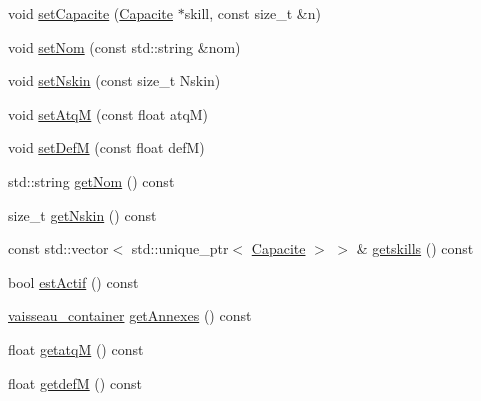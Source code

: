\begin{DoxyCompactItemize}
\item 
void \mbox{\hyperlink{class_vaisseau_ade448f61f366a5b94fbc03c955963398}{set\+Capacite}} (\mbox{\hyperlink{class_capacite}{Capacite}} $\ast$skill, const size\+\_\+t \&n)
\item 
void \mbox{\hyperlink{class_vaisseau_a2dbe73bcc7b94642ad0eff30413842d7}{set\+Nom}} (const std\+::string \&nom)
\item 
void \mbox{\hyperlink{class_vaisseau_a0c680cba0243fac2ecda59bd2fc1f1fd}{set\+Nskin}} (const size\+\_\+t Nskin)
\item 
void \mbox{\hyperlink{class_vaisseau_aad5885e38fac754abd372769c8d2dbfa}{set\+AtqM}} (const float atqM)
\item 
void \mbox{\hyperlink{class_vaisseau_a0a2a699a3a0234cbe92683b990329ae3}{set\+DefM}} (const float defM)
\item 
std\+::string \mbox{\hyperlink{class_vaisseau_a57c40e657151598e9f5ffd3dd2fdc15a}{get\+Nom}} () const
\item 
size\+\_\+t \mbox{\hyperlink{class_vaisseau_a61a0c0d457d87ebc081b5dea42748e78}{get\+Nskin}} () const
\item 
const std\+::vector$<$ std\+::unique\+\_\+ptr$<$ \mbox{\hyperlink{class_capacite}{Capacite}} $>$ $>$ \& \mbox{\hyperlink{class_vaisseau_a7026c8c71519ca32d0e41ff455775edc}{getskills}} () const
\item 
bool \mbox{\hyperlink{class_vaisseau_a4f0c76d144f9f5f41b254bde4eb350da}{est\+Actif}} () const
\item 
\mbox{\hyperlink{def__type_8h_ad123ed7c93f42c8dd68e4af28b16b639}{vaisseau\+\_\+container}} \mbox{\hyperlink{class_vaisseau_a2ea21b3478208f87754ea41b5809852a}{get\+Annexes}} () const
\item 
float \mbox{\hyperlink{class_vaisseau_a8d069f5d4a224b4c120e07541dbe40d0}{getatqM}} () const
\item 
float \mbox{\hyperlink{class_vaisseau_a761444b2f44feb6b555ba770e72b2091}{getdefM}} () const
\end{DoxyCompactItemize}
